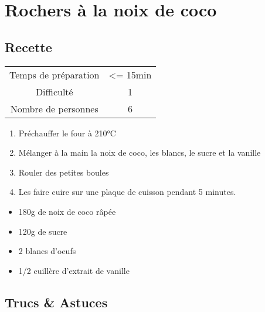 \newpage
\section{Rochers à la noix de coco}
    \label{sec:Rochers à la noix de coco}
    \subsection{Recette}
    \vspace{1cm}


    \begin{center}
        \begin{tabular}{c|c}
            Temps de préparation & <= 15min \\
            Difficulté & 1 \\
            Nombre de personnes & 6 
        \end{tabular}
    \end{center}{}

    \vspace{1cm}
    \hline
    \vspace{1cm}

    \begin{minipage}{.7\textwidth}
        \begin{enumerate}
            \item Préchauffer le four à 210°C
	    \item Mélanger à la main la noix de coco, les blancs, le sucre et la vanille
	    \item Rouler des petites boules
	    \item Les faire cuire sur une plaque de cuisson pendant 5 minutes.

        \end{enumerate}
    \end{minipage}
    \begin{minipage}{.3\textwidth}
        \begin{flushleft}
        \begin{itemize}
            \item 180g de noix de coco râpée
	    \item 120g de sucre
	    \item 2 blancs d'oeufs
	    \item 1/2 cuillère d'extrait de vanille

        \end{itemize}
        \end{flushleft}
    \end{minipage}
    
    \vspace{1cm}
    \hline
    \vspace{1cm}
    
    \subsection{Trucs \& Astuces}
        
